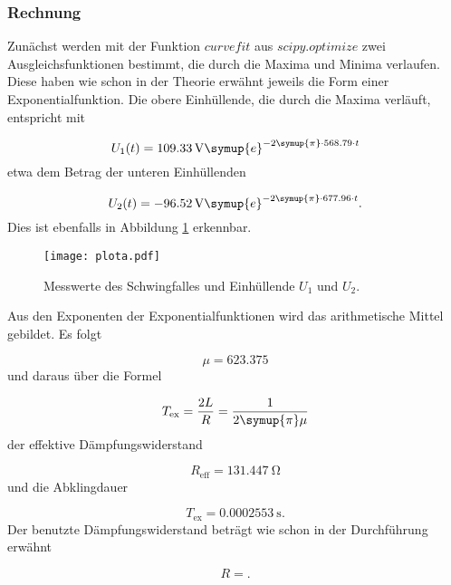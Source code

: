 \subsubsection{Rechnung}

Zunächst werden mit der Funktion $curvefit$ aus $scipy.optimize$ zwei
Ausgleichsfunktionen bestimmt, die durch die Maxima und Minima
verlaufen. Diese haben wie schon in der Theorie erwähnt jeweils die Form einer
Exponentialfunktion.
Die obere Einhüllende, die durch die Maxima verläuft, entspricht mit

\begin{equation}
  U_1(t) = \SI{109.33}{\V} \symup{e}^{-2\symup{\pi} \cdot 568.79\cdot t}
\end{equation}
etwa dem Betrag der unteren Einhüllenden

\begin{equation}
  U_2(t) = \SI{-96.52}{\V} \symup{e}^{-2\symup{\pi} \cdot 677.96\cdot t}.
\end{equation}
Dies ist ebenfalls in Abbildung \ref{fig:Schwingfall} erkennbar.

\begin{figure}[h]
  \centering
  \texttt{[image: plota.pdf]}
  \caption{Messwerte des Schwingfalles und Einhüllende $U_1$ und $U_2$.}
  \label{fig:Schwingfall}
\end{figure}

Aus den Exponenten der Exponentialfunktionen wird das arithmetische Mittel
gebildet. Es folgt

\begin{equation}
  \mu = 623.375
\end{equation}
und daraus über die Formel

\begin{equation}
  T_\text{ex} = \frac{2L}{R} = \frac{1}{2\symup{\pi}\mu}
\end{equation}
der effektive Dämpfungswiderstand

\begin{equation}
  R_\text{eff} = \SI{131.447}{\ohm}
\end{equation}
und die Abklingdauer

\begin{equation}
  T_\text{ex} = \SI{0.0002553}{\second}.
\end{equation}
Der benutzte Dämpfungswiderstand beträgt wie schon in der Durchführung erwähnt

\begin{equation}
  R =  .
\end{equation}


